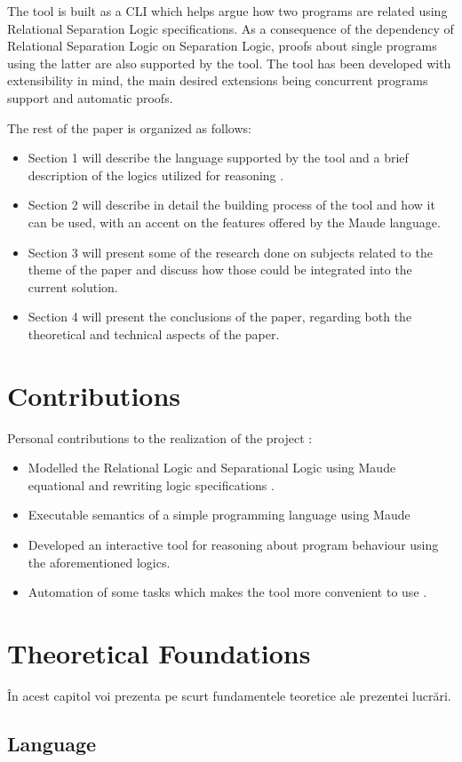 \documentclass[12pt,a4paper]{article}
\begin{document}
The tool is built as a CLI which helps argue how two programs are related using Relational Separation Logic specifications. As a consequence of the dependency of Relational Separation Logic on Separation Logic, proofs about single programs using the latter are also supported by the tool. The tool has been developed with extensibility in mind, the main desired extensions being concurrent programs support and automatic proofs. 

The rest of the paper is organized as follows: 
\begin{itemize}
	\item Section 1 will describe the language supported by the tool and a brief description of the logics utilized for reasoning .
	\item Section 2 will describe in detail the building process of the tool and how it can be used, with an accent on the features offered by the Maude language.
	\item Section 3 will present some of the research done on subjects related to the theme of the paper and discuss how those could be integrated into the current solution.
	\item Section 4 will present the conclusions of the paper, regarding both the theoretical and technical aspects of the paper.
\end{itemize}


\section{Contributions}
Personal contributions to the realization of the project : 
\begin{itemize}
	\item Modelled the Relational Logic and Separational Logic using Maude equational and rewriting logic specifications . 
	\item Executable semantics of a simple programming language using Maude
	\item Developed an interactive tool for reasoning about program behaviour using the aforementioned logics.
	\item Automation of some tasks which makes the tool more convenient to use .
\end{itemize}
\section{Theoretical Foundations}
În acest capitol voi prezenta pe scurt fundamentele teoretice ale prezentei lucrări.
\subsection{Language}
\end{document}
